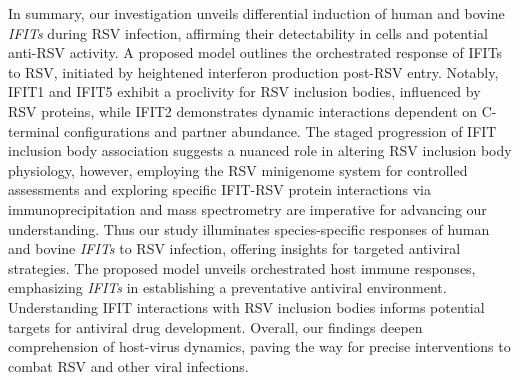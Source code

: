 In summary, our investigation unveils differential induction of human and bovine \textit{IFITs} during RSV infection, affirming their detectability in cells and potential anti-RSV activity. A proposed model outlines the orchestrated response of IFITs to RSV, initiated by heightened interferon production post-RSV entry. Notably, IFIT1 and IFIT5 exhibit a proclivity for RSV inclusion bodies, influenced by RSV proteins, while IFIT2 demonstrates dynamic interactions dependent on C-terminal configurations and partner abundance. The staged progression of IFIT inclusion body association suggests a nuanced role in altering RSV inclusion body physiology, however, employing the RSV minigenome system for controlled assessments and exploring specific IFIT-RSV protein interactions via immunoprecipitation and mass spectrometry are imperative for advancing our understanding. Thus our study illuminates species-specific responses of human and bovine \textit{IFITs} to RSV infection, offering insights for targeted antiviral strategies. The proposed model unveils orchestrated host immune responses, emphasizing \textit{IFITs} in establishing a preventative antiviral environment. Understanding IFIT interactions with RSV inclusion bodies informs potential targets for antiviral drug development. Overall, our findings deepen comprehension of host-virus dynamics, paving the way for precise interventions to combat RSV and other viral infections.

